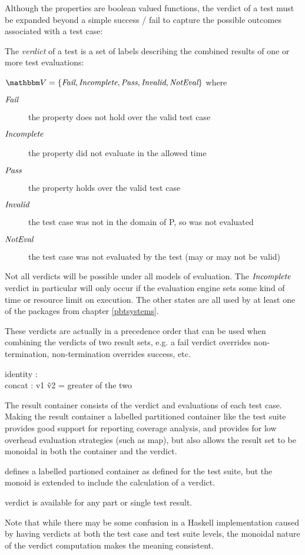 Although the properties are boolean valued functions,
the verdict of a test must be expanded beyond a simple success / fail
to capture the possible outcomes associated with a test case:

\begin{df}[Verdicts]
The \emph{verdict} of a test is a set of labels describing the combined results of one or more test evaluations:

 $\verdictset = \{ \fail, \nonterm, \success, \invalid, \noteval \}$ where

\begin{description}
\item[$\emph{Fail}$] the property does not hold over the valid test case
\item[$\emph{Incomplete}$] the property did not evaluate in the allowed time
\item[$\emph{Pass}$] the property holds over the valid test case
\item[$\emph{Invalid}$] the test case was not in the domain of P, so was not evaluated
\item[$\emph{NotEval}$] the test case was not evaluated by the test (may or may not be valid)
\end{description}
\end{df}

Not all verdicts will be possible under all models of evaluation.
The $\emph{Incomplete}$ verdict in particular will only occur if the evaluation engine 
sets some kind of time or resource limit on execution.
The other states are all used by at least one of the packages from chapter \ref{pbtsystems}.

These verdicts are actually in a precedence order that can be used when combining 
the verdicts of two result sets,
e.g. a fail verdict overrides non-termination, non-termination overrides success, etc.
\begin{df}
identity : \noteval \\
concat : v1 \^ v2 = greater of the two\\
\end{df}

The result container consists of the verdict and evaluations of each test case.
Making the result container a labelled partitioned container like the test suite
provides good support for reporting coverage analysis,
and provides for low overhead evaluation strategies (such as map),
but also allows the result set to be monoidal in both the container and the verdict.

\begin{df}
defines a labelled partioned container as defined for the test suite,
but the monoid is extended to include the calculation of a verdict.

verdict is available for any part or single test result.
\end{df}
Note that while there may be some confusion in a Haskell implementation
caused by having verdicts at both the test case and test suite levels,
the monoidal nature of the verdict computation makes the meaning consistent.

